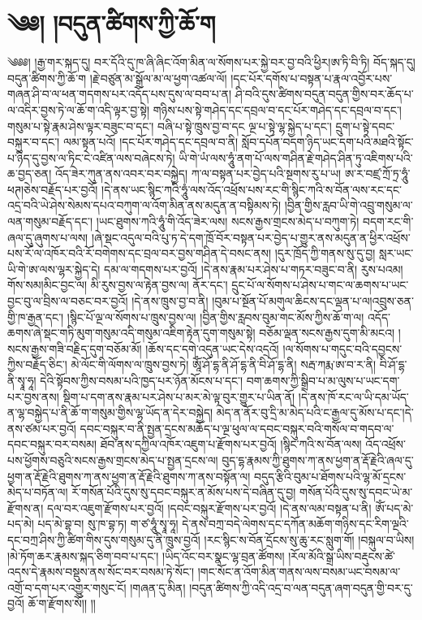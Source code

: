 \chapter{༄༅། །བདུན་ཚིགས་ཀྱི་ཆོ་ག}༄༅༅། །རྒྱ་གར་སྐད་དུ། བར་དོའི་དུ་ཁ་ཞི་ཞིང་འོག་མིན་ལ་སོགས་པར་སྐྱེ་བར་བྱ་བའི་ཕྱིར།ཨ་ཏི་བི་ཏི། བོད་སྐད་དུ། བདུན་ཚིགས་ཀྱི་ཆོ་ག །རྗེ་བཙུན་མ་སྒྲོལ་མ་ལ་ཕྱག་འཚལ་ལོ། །དང་པོར་དགོས་པ་བསྟན་པ་རྣལ་འབྱོར་པས་གཞན་ཤི་བ་ལ་ཕན་གདགས་པར་འདོད་པས་དུས་ལ་བབ་པ་ན། ཤི་བའི་དུས་ཚིགས་བདུན་བདུན་གྱིས་བར་ཆོད་པ་ལ་འདིར་བྱས་ཏེ་ལ་ཆོ་ག་འདི་ལྟར་བྱ་སྟེ། གཉིས་པས་སྟེ་གཤེད་དང་དབྲལ་བ་དང་པོར་གཤེད་དང་དབྲལ་བ་དང་། གསུམ་པ་སྟེ་རྣམ་ཤེས་ལྟར་བཟུང་བ་དང་། བཞི་པ་སྟེ་ཁྲུས་བྱ་བ་དང ལྔ་པ་སྟེ་ལྷ་སྐྱེད་པ་དང་། དྲུག་པ་སྟེ་དབང་བསྐུར་བ་དང་། ལམ་སྟན་པའོ། །དང་པོར་གཤེད་དང་དབྲལ་བ་ནི། སློབ་དཔོན་བདག་ཉིད་ཡང་དག་པའི་མཐའི་སྟོང་པ་ཉིད་དུ་བྱས་ལ་ཏིང་ངེ་འཛིན་ལས་བཞེངས་ཏེ། ཡི་གེ་ཡཾ་ལས་ཧཱུཾ་ནག་པོ་ལས་གཤིན་རྗེ་གཤེད་ཤིན་ཏུ་འཇིགས་པའི་ཆ་བྱད་ཅན། འོད་ཟེར་ཀུན་ནས་འབར་བར་བསྐྱེད། ཀ་ལ་བསྟན་པར་བྱེད་པའི་སྔགས་རུ་པ་ཡ། ཨ་ར་བཛྲ་ཀྲོ་ཏྲ་ཧཱུཾ་ཕཊ།ཅེས་བརྗོད་པར་བྱའོ། །དེ་ནས་ཡང་སྙིང་ཀའི་ཧཱུཾ་ལས་འོད་འཕྲོས་པས་རང་གི་སྙིང་ཀའི་ས་བོན་ལས་རང་དང་འདྲ་བའི་ཡེ་ཤེས་སེམས་དཔའ་བཀུག་ལ་འོག་མིན་ནས་མདུན་ན་བསྟིམས་ཏེ། །བྱིན་གྱིས་རླབ་ཡི་གེ་འབྲུ་གསུམ་ལ་ལན་གསུམ་བརྗོད་དང་། །ཡང་ཐུགས་ཀའི་ཧཱུཾ་གི་འོད་ཟེར་ལས། སངས་རྒྱས་གྲངས་མེད་པ་བཀུག་ཏེ། བདག་རང་གི་ཞལ་དུ་ཞུགས་པ་ལས། །ཞེ་སྡང་འདུལ་བའི་པུ་ཏ་དེ་དག་ཁྲོ་བོར་བསྟན་པར་བྱེད་པ་གྱུར་ནས་མདུན་ན་ཕྱིར་འཕྲོས་པས་རོ་ལ་འཁོར་བའི་རོ་བགེགས་དང་བྲལ་བར་བྱས་གཤིན་དེ་བསང་ནས། །དུར་ཁྲོད་ཀྱི་གནས་སུ་དུ་བྱ། སླར་ཡང་ཡི་གེ་ཨ་ལས་ལྷར་སྐྱེད་དེ། དམ་ལ་གདགས་པར་བྱའོ། །དེ་ནས་རྣམ་པར་ཤེས་པ་གཏར་བཟུང་བ་ནི། རུས་པའམ། གོས་སམ།མིང་བྱང་ལ། མི་རུས་བྱས་ལ་རྟེན་བྱས་ལ། ནོར་དང་། དྲུང་པོ་ལ་སོགས་པ་ཤེས་པ་གང་ལ་ཆགས་པ་ཡང་བྱང་བུ་ལ་བྲིས་ལ་བཅང་བར་བྱའོ། །དེ་ནས་ཁྲུས་བྱ་བ་ནི། །བུམ་པ་སྔོན་པོ་མགུལ་ཆིངས་དང་ལྡན་པ་ལ།འབྲུས་ཅན་གྱི་ཁ་རྒྱན་དང་། །སྙིང་པོ་ལྔ་ལ་སོགས་པ་ཁྲུས་བྱས་ལ། །བྱིན་གྱིས་རླབས་བུམ་གང་མོས་ཀྱིས་ཆོ་ག་ལ། འདོད་ཆགས་ཞེ་སྡང་གཏི་མུག་གསུམ་འདི་གསུམ་འཇིག་རྟེན་དུག་གསུམ་སྟེ། བཅོམ་ལྡན་སངས་རྒྱས་དུག་མི་མངའ། །སངས་རྒྱས་གཟི་བརྗིད་དུག་བཅོམ་མོ། །ཆོས་དང་དགེ་འདུན་ཡང་དེས་འདྲའོ། །ལ་སོགས་པ་གདུང་བའི་དབྱངས་ཀྱིས་བརྗོད་ཅིང་། མེ་ལོང་གི་ལོགས་ལ་ཁྲུས་བྱས་ཏེ། ཨཱོཾ་ཤོ་དྷ་ནི་ཤོ་དྷ་ནི་བི་ཤོ་དྷ་ནི། སརྦ་ཀརྨ་ཨ་བ་ར་ནི། བི་ཤོ་དྷ་ནི་སྭཱ་ཧཱ། དེའི་སྟོབས་ཀྱིས་བསམ་པའི་ཁྱད་པར་ཉོན་མོངས་པ་དང་། བག་ཆགས་ཀྱི་སྒྲིབ་པ་མ་ལུས་པ་ཡང་དག་པར་བྱས་ནས། སྡིག་པ་དག་ནས་རྣམ་པར་ཤེས་པ་མར་མེ་ལྟ་བུར་གྱུར་པ་ཡིན་ནོ། །དེ་ནས་ཁོ་རང་ལ་ཡི་དམ་ཡོད་ན་ལྷ་བསྐྱེད་པ་ནི་ཆོ་ག་གསུམ་གྱིས་ལྷ་ཡོད་ན་དེར་བསྐྱེད། མེད་ན་ནོར་བུ་དྲི་མ་མེད་པའི་ང་རྒྱལ་དུ་མོས་པ་དང་།དེ་ནས་ཙམ་པར་བྱའོ། དབང་བསྐུར་བ་ནི་སྤྱན་དྲངས་མཆོད་པ་ལྔ་ཕུལ་ལ་དབང་བསྐུར་བའི་གསོལ་བ་གདབ་ལ་དབང་བསྐུར་བར་བསམ། ཐོབ་ནས་དཀྱིལ་འཁོར་འཇུག་པ་རྫོགས་པར་བྱའོ། །སྙིང་ཀའི་ས་བོན་ལས། འོད་འཕྲོས་པས་ཕྱོགས་བཅུའི་སངས་རྒྱས་གྲངས་མེད་པ་སྤྱན་དྲངས་ལ། བུད་དྷ་རྣམས་ཀྱི་ཐུགས་ཀ་ནས་ཕྱག་ན་རྡོ་རྗེའི་ཞལ་དུ་ཕྱག་ན་རྡོ་རྗེའི་ཐུགས་ཀ་ནས་ཕྱག་ན་རྡོ་རྗེའི་ཐུགས་ཀ་ནས་བསྟོན་ལ། བདུད་རྩིའི་བུམ་པ་ཐོགས་པའི་ལྷ་མོ་དྲངས་མེད་པ་བཏོན་ལ། རོ་གསོན་པོའི་དུས་སུ་དབང་བསྐུར་ན་མོས་པས་དེ་བཞིན་དུ་བྱ། གསོན་པོའི་དུས་སུ་དབང་ཡེ་མ་རྫོགས་ན། དལ་བར་འཇུག་རྫོགས་པར་བྱའོ། །དབང་བསྐུར་རྫོགས་པར་བྱའོ། །དེ་ནས་ལམ་བསྟན་པ་ནི། ཨོཾ་པད་མེ་པད་མེ། པད་མེ་བྷ་བ། སུ་ཁ་བྷ་ཏ། ག་ཙ་ཧཱུཾ་སྭཱ་ཧཱ། དེ་ནས་བཀྲ་བདེ་ལེགས་དང་དཀོན་མཆོག་གཉིས་དང་རིག་ལྔའི་དང་བཀྲ་ཤིས་ཀྱི་ཚིག་གིས་དུས་གསུམ་དུ་ནི་ཁྲུས་བྱའོ། །རང་སྙིང་ས་བོན་དྲོངས་སུ་ཆུ་རང་སླུག་གོ། །བསྐུལ་བ་ཡིས། །མེ་ཏོག་ཆར་རྣམས་སྐད་ཅིག་བབ་པ་དང་། །ཡིད་འོང་བར་སྣང་ལྷ་བྲན་ཚོགས། །རོལ་མོའི་སྒྲ་ཡིས་བརྡུངས་ཚེ་འདས་དེ་རྣམས་བསྡུས་ནས་སོང་བར་བསམ་ཏེ་སོང་། །གང་སོང་ན་འོག་མིན་གནས་ལས་བསམ་ཡང་བསམ་ལ་འགྲོ་བ་དག་པར་འགྱུར་གསུང་ངོ། །གཞན་དུ་མིན། །བདུན་ཚིགས་ཀྱི་འདི་འདྲ་བ་ལན་བདུན་ཞག་བདུན་གྱི་བར་དུ་བྱའོ། ཆོ་ག་རྫོགས་སོ།། །།